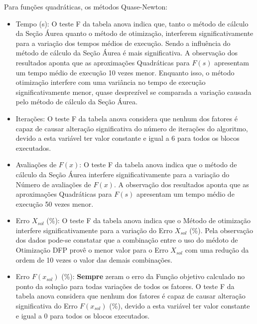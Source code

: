     Para funções quadráticas, os métodos Quase-Newton:
    \begin{itemize}
        \item {Tempo (s):} O teste F da tabela anova indica que, tanto o método de cálculo da Seção Áurea quanto o método de otimização, interferem significativamente para a variação dos tempos médios de execução. Sendo a influência do método de cálculo da Seção Áurea é mais significativa. A observação dos resultados aponta que as aproximações Quadráticas para $F(s)$ apresentam um tempo médio de execução 10 vezes menor. Enquanto isso, o método otimização interfere com uma variância no tempo de execução significativamente menor, quase desprezível se comparada a variação causada pelo método de cálculo da Seção Áurea. 
        \item {Iterações:} O teste F da tabela anova considera que nenhum dos fatores é capaz de causar alteração significativa do número de iterações do algoritmo, devido a esta variável ter valor constante e igual a 6 para todos os blocos executados.
        \item {Avaliações de $F(x)$:} O teste F da tabela anova indica que o método de cálculo da Seção Áurea interfere significativamente para a variação do Número de avaliações de $F(x)$. A observação dos resultados aponta que as aproximações Quadráticas para $F(s)$ apresentam um tempo médio de execução 50 vezes menor. 
        \item {Erro $X_{sol}$ (\%):} O teste F da tabela anova indica que o Método de otimização interfere significativamente para a variação do Erro $X_{sol}$ (\%). Pela observação dos dados pode-se constatar que a combinação entre o uso do médoto de Otimização DFP provê o menor valor para o Erro $X_{sol}$ com uma redução da ordem de 10 vezes o valor das demais combinações.
        \item {Erro $F(x_{sol})$ (\%):} \textbf{Sempre} zeram o erro da Função objetivo calculado no ponto da solução para todas variações de todos os fatores. O teste F da tabela anova considera que nenhum dos fatores é capaz de causar alteração significativa do Erro $F(x_{sol})$ (\%), devido a esta variável ter valor constante e igual a 0 para todos os blocos executados.
    \end{itemize}   